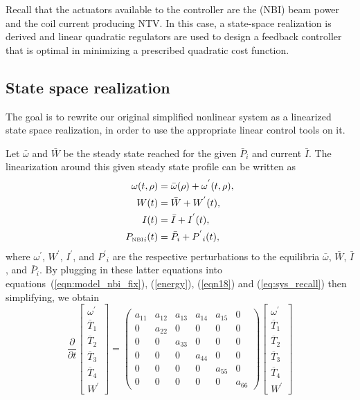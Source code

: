 \documentclass[12pt,lot, lof]{puthesis}
\begin{document}
 Recall that the actuators available to the controller are the (NBI) beam power and the coil current producing NTV.
In this case, a state-space realization is derived and linear quadratic regulators are used to design a feedback controller that is optimal in minimizing a prescribed quadratic cost function.
 
\subsection{State space realization}
The goal is to rewrite our original simplified nonlinear system as a linearized state space realization, in order to use the appropriate linear control tools on it.

 Let $\bar{\omega}$ and $\bar{W}$ be the steady state reached for the given $\bar{P}_i $ and current $\bar{I}$. The linearization around this given steady state profile can be written as
\begin{align}
\omega (t, \rho) &= \bar{\omega} (\rho) + \omega^{'}(t, \rho), \\
W (t) &= \bar{W} + W^{'}(t), \\
I (t) &= \bar{I} + I^{'}(t),\\
{P_\textrm{\tiny NBI}}_i (t) &= \bar{P}_i + {P^{'}}_i(t),
\end{align}
where $ \omega^{'}$, $W^{'}$, $ I^{'}$, and ${P^{'}}_i$ are the respective perturbations to the equilibria $\bar{\omega}$, $\bar{W}$, $\bar{I}$, and ${\bar{P}}_i$.
By plugging in these latter equations into equations~(\ref{eqn:model_nbi_fix}), (\ref{energy}), (\ref{eqn18}) and (\ref{eq:sys_recall}) then simplifying, we obtain
\begin{equation*}
\frac{\partial}{\partial t}   \left[\! \begin{array}{c} \omega^{'} \\ \overline{T}_1 \\ \overline{T}_2\\ \overline{T}_3 \\ \overline{T}_4  \\ W^{'}\end{array}\!\right]=
  { \left(\! \begin{array}{cccccc} a_{11}  & a_{12} & a_{13} & a_{14} & a_{15} & 0\\ 0 & a_{22}&0 &0&0 & 0\\0 &0& a_{33} &0&0&0\\ 0 &0&0 &a_{44} &0&0  \\ 0 &0&0 &0&a_{55} &0 \\  0 & 0 & 0& 0& 0& a_{66}  \end{array} \! \right)} \left[\! \begin{array}{c} \omega^{'} \\ \overline{T}_1 \\ \overline{T}_2\\ \overline{T}_3 \\ \overline{T}_4  \\ W^{'}   \end{array}  \!\right] 
  \end{equation*}
\end{document}
